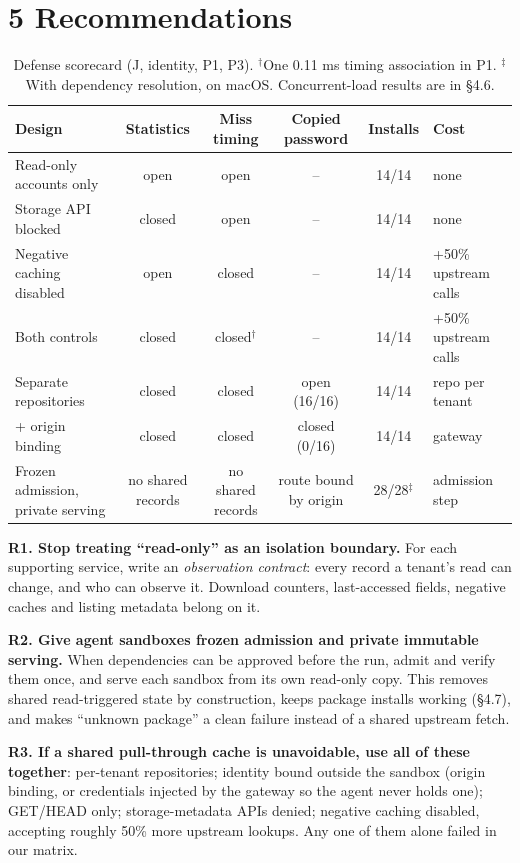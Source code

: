\documentclass[11pt]{article}
\begin{document}
\section*{5 Recommendations}
\begin{table}[h]\small\centering
\begin{tabularx}{\linewidth}{Xccccl}
\toprule
Design & Statistics & Miss timing & Copied password & Installs & Cost \\
\midrule
Read-only accounts only & open & open & -- & 14/14 & none \\
Storage API blocked & closed & open & -- & 14/14 & none \\
Negative caching disabled & open & closed & -- & 14/14 & +50\% upstream calls \\
Both controls & closed & closed$^\dagger$ & -- & 14/14 & +50\% upstream calls \\
Separate repositories & closed & closed & open (16/16) & 14/14 & repo per tenant \\
\quad + origin binding & closed & closed & closed (0/16) & 14/14 & gateway \\
Frozen admission, private serving & no shared records & no shared records & route bound by origin & 28/28$^\ddagger$ & admission step \\
\bottomrule
\end{tabularx}
\caption{Defense scorecard (J, identity, P1, P3). $^\dagger$One 0.11 ms timing association in P1. $^\ddagger$With dependency resolution, on macOS. Concurrent-load results are in \S4.6.}
\end{table}

\textbf{R1. Stop treating ``read-only'' as an isolation boundary.} For each supporting service, write an \emph{observation contract}: every record a tenant's read can change, and who can observe it. Download counters, last-accessed fields, negative caches and listing metadata belong on it.

\textbf{R2. Give agent sandboxes frozen admission and private immutable serving.} When dependencies can be approved before the run, admit and verify them once, and serve each sandbox from its own read-only copy. This removes shared read-triggered state by construction, keeps package installs working (\S4.7), and makes ``unknown package'' a clean failure instead of a shared upstream fetch.

\textbf{R3. If a shared pull-through cache is unavoidable, use all of these together}: per-tenant repositories; identity bound outside the sandbox (origin binding, or credentials injected by the gateway so the agent never holds one); GET/HEAD only; storage-metadata APIs denied; negative caching disabled, accepting roughly 50\% more upstream lookups. Any one of them alone failed in our matrix.
\end{document}
